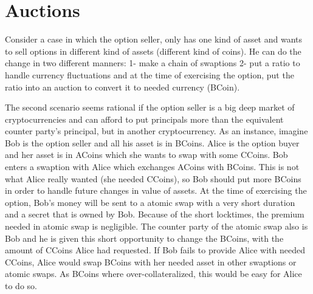 
\section{Auctions}
\label{auctions}

Consider a case in which the option seller, only has one kind of asset and wants to sell options in different kind of assets (different kind of coins). He can do the change in two different manners: 1- make a chain of swaptions 2- put a ratio to handle currency fluctuations and at the time of exercising the option, put the ratio into an auction to convert it to needed currency (BCoin).

The second scenario seems rational if the option seller is a big deep market of cryptocurrencies and can afford to put principals more than the equivalent counter party's principal, but in another cryptocurrency.
As an instance, imagine Bob is the option seller and all his asset is in BCoins. Alice is the option buyer and her asset is in ACoins which she wants to swap with some CCoins. Bob enters a swaption with Alice which exchanges ACoins with BCoins. This is not what Alice really wanted (she needed CCoins), so Bob should put more BCoins in order to handle future changes in value of assets. At the time of exercising the option, Bob's money will be sent to a atomic swap with a very short duration and a secret that is owned by Bob. Because of the short locktimes, the premium needed in atomic swap is negligible. The counter party of the atomic swap also is Bob and he is given this short opportunity to change the BCoins, with the amount of CCoins Alice had requested. If Bob fails to provide Alice with needed CCoins, Alice would swap BCoins with her needed asset in other swaptions or atomic swaps. As BCoins where over-collateralized, this would be easy for Alice to do so.
    

% 




